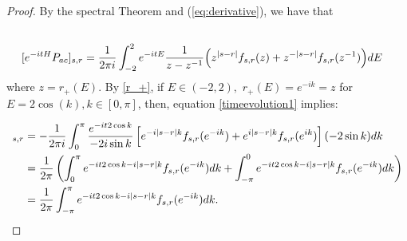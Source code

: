 \documentclass[12pt,oneside,onecolumn,open]{article}
\begin{document}
\begin{proof}
By the spectral Theorem and (\ref{eq:derivative}), we have  that 
\begin{align}\label{timeevolution1}
\\ & \notag [  e^{-itH}P_{ac}]_{s,r} = \frac{1}{2 \pi i}  \int_{-2}^2 e^{-it E } \frac{ 1 }{ z - z^{-1} }  \Big ( z^{|s-r|} f_{s, r}(z)  + z^{-|s-r|} f_{s, r}(z^{-1}) \Big ) dE
\end{align} where $z=r_+(E)$.
By \eqref{r_+}, if $E\in (-2, 2),$   $r_+(E)= e^{-ik } = z$ for $E = 2\cos (k), k\in [0,\pi ]$, then, equation \eqref{timeevolution1} implies:



\begin{align}
    [e^{-itH}P_{ac}]_{s,r} &= -\frac{1}{2\pi i}\int _{ 0}^{\pi} \frac{ e^{-it2\cos k}}{-2i\sin k}\left[ e^{- i| s-r |k }f_{s,r}(e^{-ik }) + e^{ i|s-r|k }f_{s,r}(e^{ik })\right](-2\sin k )dk \\
         & \notag =  \frac{1}{2\pi} \left( \int_{0}^{\pi } e^{-it2\cos k - i|s-r|k} f_{s,r}(e^{-ik}) dk + \int_{-\pi}^{0} e^{-it2\cos k - i|s-r|k} f_{s,r}(e^{-ik}) dk \right)  \\ 
         & \notag =  \frac{1}{2\pi}\int_{-\pi}^{\pi} e^{-it2\cos k - i|s-r|k} f_{s,r}(e^{-ik}) dk.
\end{align}




\end{proof}
\end{document}
